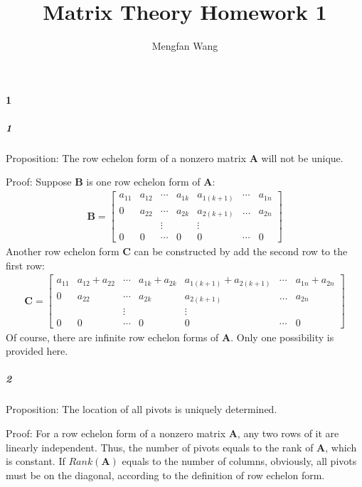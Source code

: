 \documentclass[22pt]{article}
\author{Mengfan Wang}
\title{Matrix Theory Homework 1}
\begin{document}
\maketitle 
	\paragraph{1} 
		\subparagraph{1}Proposition: The row echelon form of a nonzero matrix $\mathbf{A}$ will not be unique. 

		Proof: Suppose $\mathbf{B}$ is one row echelon form of $\mathbf{A}$:
		\begin{align}
				\mathbf{B} = 
				\left[ \begin{array}{ccccccc}
				a_{11} & a_{12} & \cdots & a_{1k} & a_{1(k+1)} & \cdots & a_{1n}\\
				0 & a_{22} & \cdots & a_{2k} & a_{2(k+1)} & \dots & a_{2n}\\	
				&& \vdots && \vdots \\		
				0&0& \cdots &0&0& \cdots & 0
				\end{array}		\right]
		\end{align}
		Another row echelon form $\mathbf{C}$ can be constructed by add the second row to the first row:
		\begin{align}
				\mathbf{C} = 
				\left[ \begin{array}{ccccccc}
				a_{11} & a_{12}+a_{22} & \cdots & a_{1k}+a_{2k} & a_{1(k+1)}+a_{2(k+1)} & \cdots & a_{1n}+a_{2n}\\
				0 & a_{22} & \cdots & a_{2k} & a_{2(k+1)} & \dots & a_{2n}\\	
				&& \vdots && \vdots \\		
				0&0& \cdots &0&0& \cdots & 0
				\end{array}		\right]
		\end{align}
		Of course, there are infinite row echelon forms of $\mathbf{A}$. Only one possibility is provided here. 


		\subparagraph{2} Proposition: The location of all pivots is uniquely determined.

		Proof: For a row echelon form of a nonzero matrix $\mathbf{A}$, any two rows of it are linearly independent. Thus, the number of pivots equals to the rank of $\mathbf{A}$, which is constant. If $Rank(\mathbf{A})$ equals to the number of columns, obviously, all pivots must be on the diagonal, according to the definition of row echelon form. 
\end{document}
